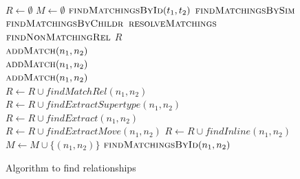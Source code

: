 \begin{figure}[htbp]
\fontsize{9.5}{10.5}\selectfont
\begin{algorithmic}[1]
\State $R \gets \emptyset$
\State $M \gets \emptyset$
\State $\textsc{findMatchingsById}(t_1,t_2)$
\State $\textsc{findMatchingsBySim}$
\State $\textsc{findMatchingsByChildr}$
\State $\textsc{resolveMatchings}$
\State $\textsc{findNonMatchingRel}$
\State \Return $R$
\\
    \State $\textsc{addMatch}(n_1, n_2)$
  \EndIf
\EndFor
\EndProcedure
\\
    \State $\textsc{addMatch}(n_1, n_2)$
  \EndIf  
\EndFor
\EndProcedure
\\
    \State $\textsc{addMatch}(n_1, n_2)$
  \EndIf
\EndFor
\EndProcedure
\\
  \State $R \gets R \cup \mathit{findMatchRel}(n_1, n_2)$
\EndFor
\EndProcedure
\\
  \State $R \gets R \cup \mathit{findExtractSupertype}(n_1, n_2)$
  \State $R \gets R \cup \mathit{findExtract}(n_1, n_2)$
  \State $R \gets R \cup \mathit{findExtractMove}(n_1, n_2)$
\EndFor
{}
  \State $R \gets R \cup \mathit{findInline}(n_1, n_2)$
\EndFor
\EndProcedure
\\
  \State $M \gets M \cup \{(n_1, n_2)\}$
  \State $\textsc{findMatchingsById}(n_1,n_2)$
\EndIf
\EndProcedure
\EndProcedure
\end{algorithmic}
\caption{Algorithm to find relationships}
\label{AlgoGeneral}
\end{figure}


